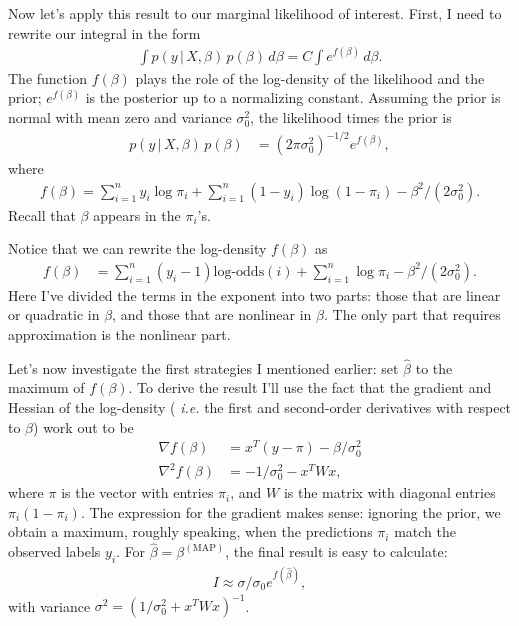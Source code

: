 \documentclass[final]{siamltex}
\newcommand{\smint}{\textstyle\int}
\newcommand{\logodds}{\mbox{log-odds}}
\begin{document}
Now let's apply this result to our marginal likelihood of
interest. First, I need to rewrite our integral in the form
\begin{align*}
\smint p(y \,|\, X, \beta) \, p(\beta) \, d\beta
= C \smint e^{f(\beta)} \, d\beta.
\end{align*}
The function $f(\beta)$ plays the role of the log-density of the
likelihood and the prior; $e^{f(\beta)}$ is the posterior up to a
normalizing constant. Assuming the prior is normal with mean zero and
variance $\sigma_0^2$, the likelihood times the prior is
\begin{align*}
p(y \,|\, X, \beta) \, p(\beta) &= (2\pi\sigma_0^2)^{-1/2} e^{f(\beta)},
\end{align*}
where
\begin{align*}
f(\beta) = \sum_{i=1}^n y_i\log\pi_i + \sum_{i=1}^n (1-y_i)\log(1-\pi_i)
- \beta^2/(2\sigma_0^2).
\end{align*}
Recall that $\beta$ appears in the $\pi_i$'s.

Notice that we can rewrite the log-density $f(\beta)$ as
\begin{align*}
f(\beta) &= \sum_{i=1}^n (y_i-1)\logodds(i) + \sum_{i=1}^n \log\pi_i
-\beta^2/(2\sigma_0^2).
\end{align*}
Here I've divided the terms in the exponent into two parts: those that
are linear or quadratic in $\beta$, and those that are nonlinear in
$\beta$. The only part that requires approximation is the nonlinear
part.

Let's now investigate the first strategies I mentioned earlier: set
$\hat{\beta}$ to the maximum of $f(\beta)$. To derive the result I'll
use the fact that the gradient and Hessian of the log-density ({\em
  i.e.} the first and second-order derivatives with respect to
$\beta$) work out to be
\begin{align*}
\nabla f(\beta)   &= x^T(y-\pi) - \beta/\sigma_0^2 \\
\nabla^2 f(\beta) &= -1/\sigma_0^2 - x^TWx,
\end{align*}
where $\pi$ is the vector with entries $\pi_i$, and $W$ is the matrix
with diagonal entries $\pi_i(1-\pi_i)$. The expression for the
gradient makes sense: ignoring the prior, we obtain a maximum, roughly
speaking, when the predictions $\pi_i$ match the observed labels
$y_i$. For $\hat{\beta} = \beta^{\mathrm{(MAP)}}$, the final result is
easy to calculate:
\begin{align*}
I \approx \sigma/\sigma_0 e^{f(\hat{\beta})},
\end{align*} 
with variance $\sigma^2 = (1/\sigma_0^2 + x^TWx)^{-1}$.
\end{document}
